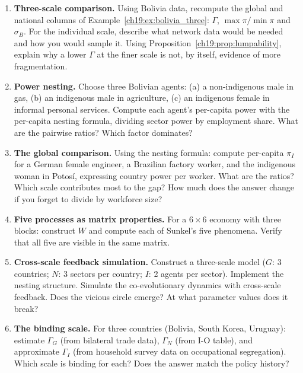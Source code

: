 \documentclass[../structural_economics_book.tex]{subfiles}
\begin{document}
\begin{enumerate}[label=\textbf{19.\arabic*}, leftmargin=3em]

\item \textbf{Three-scale comparison.} Using Bolivia data, recompute the global and national columns of Example~\ref{ch19:ex:bolivia_three}: $\Gamma$, $\max\pi/\min\pi$ and $\sigma_B$. For the individual scale, describe what network data would be needed and how you would sample it. Using Proposition~\ref{ch19:prop:lumpability}, explain why a lower $\Gamma$ at the finer scale is not, by itself, evidence of more fragmentation.

\item \textbf{Power nesting.} Choose three Bolivian agents: (a) a non-indigenous male in gas, (b) an indigenous male in agriculture, (c) an indigenous female in informal personal services. Compute each agent's per-capita power with the per-capita nesting formula, dividing sector power by employment share. What are the pairwise ratios? Which factor dominates?

\item \textbf{The global comparison.} Using the nesting formula: compute per-capita $\pi_I$ for a German female engineer, a Brazilian factory worker, and the indigenous woman in Potos\'{i}, expressing country power per worker. What are the ratios? Which scale contributes most to the gap? How much does the answer change if you forget to divide by workforce size?

\item \textbf{Five processes as matrix properties.} For a $6 \times 6$ economy with three blocks: construct $W$ and compute each of Sunkel's five phenomena. Verify that all five are visible in the same matrix.

\item \textbf{Cross-scale feedback simulation.} Construct a three-scale model ($G$: 3 countries; $N$: 3 sectors per country; $I$: 2 agents per sector). Implement the nesting structure. Simulate the co-evolutionary dynamics with cross-scale feedback. Does the vicious circle emerge? At what parameter values does it break?

\item \textbf{The binding scale.} For three countries (Bolivia, South Korea, Uruguay): estimate $\Gamma_G$ (from bilateral trade data), $\Gamma_N$ (from I-O table), and approximate $\Gamma_I$ (from household survey data on occupational segregation). Which scale is binding for each? Does the answer match the policy history?


\end{enumerate}
\end{document}
